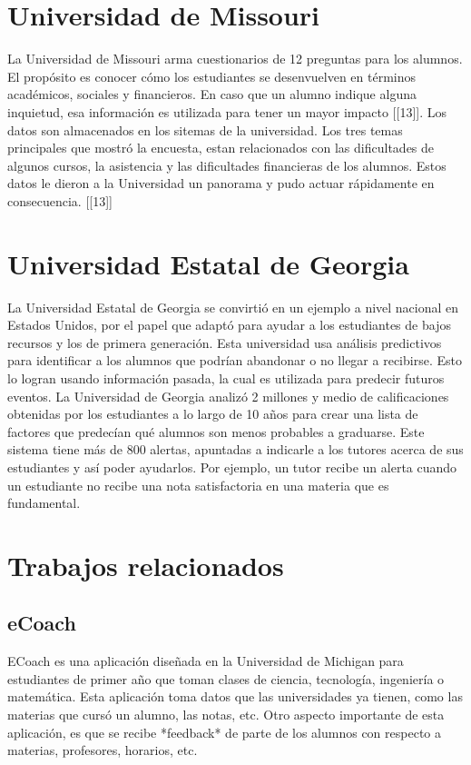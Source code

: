 \section[Universidad de Missouri]{Universidad de Missouri}
La Universidad de Missouri arma cuestionarios de 12 preguntas para los alumnos. El propósito es conocer cómo los estudiantes se desenvuelven en términos académicos, sociales y financieros. En caso que un alumno indique alguna inquietud, esa información es utilizada para tener un mayor impacto [[13]]. Los datos son almacenados en los sitemas de la universidad.
Los tres temas principales que mostró la encuesta, estan relacionados con las dificultades de algunos cursos, la asistencia y las dificultades financieras de los alumnos. Estos datos le dieron a la Universidad un panorama y pudo actuar rápidamente en consecuencia. [[13]]

\section[Universidad Estatal de Georgia]{Universidad Estatal de Georgia}

La Universidad Estatal de Georgia se convirtió en un ejemplo a nivel nacional en Estados Unidos, por el papel que adaptó para ayudar a los estudiantes de bajos recursos y los de primera generación. 
Esta universidad usa análisis predictivos para identificar a los alumnos que podrían abandonar o no llegar a recibirse. Esto lo logran usando información pasada, la cual es utilizada para predecir futuros eventos. 
La Universidad de Georgia analizó 2 millones y medio de calificaciones obtenidas por los estudiantes a lo largo de 10 años para crear una lista de factores que predecían qué alumnos son menos probables a graduarse. Este sistema tiene más de 800 alertas, apuntadas a indicarle a los tutores acerca de sus estudiantes y así poder ayudarlos. Por ejemplo, un tutor recibe un alerta cuando un estudiante no recibe una nota satisfactoria en una materia que es fundamental. 





\section[Trabajos relacionados]{Trabajos relacionados}

\subsection[eCoach]{eCoach}
ECoach es una aplicación diseñada en la Universidad de Michigan para estudiantes de primer año que toman clases de ciencia, tecnología, ingeniería o matemática. Esta aplicación toma datos que las universidades ya tienen, como las materias que cursó un alumno, las notas, etc.
Otro aspecto importante de esta aplicación, es que se recibe *feedback* de parte de los alumnos con respecto a materias, profesores, horarios, etc.


